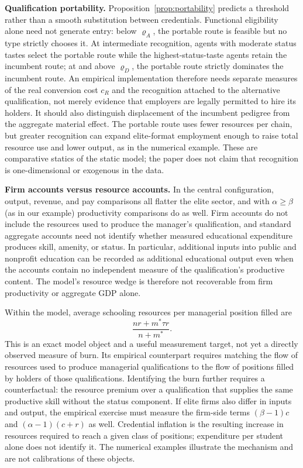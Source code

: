 \documentclass[12pt,letterpaper]{article}
\theoremstyle{definition}
\begin{document}
\textbf{Qualification portability.}
Proposition~\ref{prop:portability} predicts a threshold rather than a smooth substitution
between credentials.
Functional eligibility alone need not generate entry: below $\varrho_A$, the portable
route is feasible but no type strictly chooses it.
At intermediate recognition, agents with moderate status tastes select the portable route
while the highest-status-taste agents retain the incumbent route; at and above
$\varrho_D$, the portable route strictly dominates the incumbent route.
An empirical implementation therefore needs separate measures of the real conversion cost
$c_R$ and the recognition attached to the alternative qualification, not merely evidence
that employers are legally permitted to hire its holders.
It should also distinguish displacement of the incumbent pedigree from the aggregate
material effect.
The portable route uses fewer resources per chain, but greater recognition can expand
elite-format employment enough to raise total resource use and lower output, as in the
numerical example.
These are comparative statics of the static model; the paper does not claim that
recognition is one-dimensional or exogenous in the data.

\textbf{Firm accounts versus resource accounts.}
In the central configuration, output, revenue, and pay comparisons all flatter the elite sector, and with $\alpha\geq\beta$ (as in our example) productivity comparisons do as well.
Firm accounts do not include the resources used to produce the manager's qualification, and standard aggregate accounts need not identify whether measured educational expenditure produces skill, amenity, or status.
In particular, additional inputs into public and nonprofit education can be recorded as additional educational output even when the accounts contain no independent measure of the qualification's productive content.
The model's resource wedge is therefore not recoverable from firm productivity or aggregate GDP alone.

Within the model, average schooling resources per managerial position filled are
\[
\frac{nr+m^\ast\tau r}{n+m^\ast}.
\]
This is an exact model object and a useful measurement target, not yet a directly observed measure of burn.
Its empirical counterpart requires matching the flow of resources used to produce managerial qualifications to the flow of positions filled by holders of those qualifications.
Identifying the burn further requires a counterfactual: the resource premium over a qualification that supplies the same productive skill without the status component.
If elite firms also differ in inputs and output, the empirical exercise must measure the firm-side terms $(\beta-1)c$ and $(\alpha-1)(c+r)$ as well.
Credential inflation is the resulting increase in resources required to reach a given class of positions; expenditure per student alone does not identify it.
The numerical examples illustrate the mechanism and are not calibrations of these objects.
\end{document}
